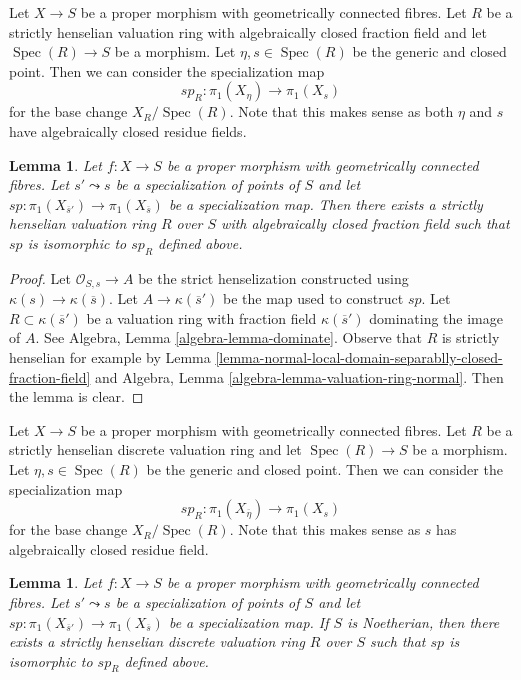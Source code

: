 \documentclass{stacks-project}
\theoremstyle{plain}
\newtheorem{lemma}[subsection]{Lemma}
\theoremstyle{definition}
\theoremstyle{remark}
\numberwithin{equation}{subsection}
\def\Spec{\mathop{\mathrm{Spec}}}
\begin{document}
\noindent
Let $X \to S$ be a proper morphism with geometrically connected fibres.
Let $R$ be a strictly henselian valuation ring with algebraically
closed fraction field and let $\Spec(R) \to S$
be a morphism. Let $\eta, s \in \Spec(R)$ be the generic and closed point.
Then we can consider the specialization map
$$
sp_R : \pi_1(X_\eta) \to \pi_1(X_s)
$$
for the base change $X_R/\Spec(R)$. Note that this makes sense as both
$\eta$ and $s$ have algebraically closed residue fields.

\begin{lemma}
\label{lemma-specialization-map-valuation-ring}
Let $f : X \to S$ be a proper morphism with geometrically connected fibres.
Let $s' \leadsto s$ be a specialization of points of $S$ and let
$sp : \pi_1(X_{\overline{s}'}) \to \pi_1(X_{\overline{s}})$
be a specialization map. Then there exists a strictly henselian
valuation ring $R$ over $S$ with algebraically closed fraction field
such that $sp$ is isomorphic to $sp_R$ defined above.
\end{lemma}

\begin{proof}
Let $\mathcal{O}_{S, s} \to A$ be the strict henselization
constructed using $\kappa(s) \to \kappa(\overline{s})$.
Let $A \to \kappa(\overline{s}')$ be the map used to construct $sp$.
Let $R \subset \kappa(\overline{s}')$ be a valuation ring with
fraction field $\kappa(\overline{s}')$ dominating the image of $A$.
See Algebra, Lemma \ref{algebra-lemma-dominate}.
Observe that $R$ is strictly henselian for example by
Lemma \ref{lemma-normal-local-domain-separablly-closed-fraction-field}
and Algebra, Lemma \ref{algebra-lemma-valuation-ring-normal}.
Then the lemma is clear.
\end{proof}

\noindent
Let $X \to S$ be a proper morphism with geometrically connected fibres.
Let $R$ be a strictly henselian discrete valuation ring and let
$\Spec(R) \to S$ be a morphism. Let $\eta, s \in \Spec(R)$ be the
generic and closed point. Then we can consider the specialization map
$$
sp_R : \pi_1(X_{\overline{\eta}}) \to \pi_1(X_s)
$$
for the base change $X_R/\Spec(R)$. Note that this makes sense as $s$
has algebraically closed residue field.

\begin{lemma}
\label{lemma-specialization-map-discrete-valuation-ring}
Let $f : X \to S$ be a proper morphism with geometrically connected fibres.
Let $s' \leadsto s$ be a specialization of points of $S$ and let
$sp : \pi_1(X_{\overline{s}'}) \to \pi_1(X_{\overline{s}})$
be a specialization map. If $S$ is Noetherian, then
there exists a strictly henselian
discrete valuation ring $R$ over $S$ such that $sp$ is isomorphic to $sp_R$
defined above.
\end{lemma}
\end{document}
